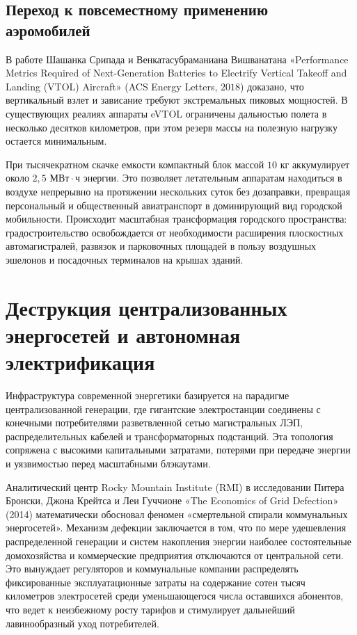 \documentclass[12pt,a4paper]{article}
\begin{document}
\subsection{Переход к повсеместному применению аэромобилей}

В работе Шашанка Срипада и Венкатасубраманиана Вишванатана 
«Performance Metrics Required of Next-Generation Batteries 
to Electrify Vertical Takeoff and Landing (VTOL) Aircraft» 
(ACS Energy Letters, $2018$) доказано, что вертикальный взлет и 
зависание требуют экстремальных пиковых мощностей. В существующих 
реалиях аппараты eVTOL ограничены дальностью полета в несколько 
десятков километров, при этом резерв массы на полезную нагрузку 
остается минимальным. 

При тысячекратном скачке емкости компактный 
блок массой $10\text{ кг}$ аккумулирует около 
$2{,}5\text{ МВт}\cdot\text{ч}$ энергии. Это позволяет летательным 
аппаратам находиться в воздухе непрерывно на протяжении нескольких 
суток без дозаправки, превращая персональный и общественный 
авиатранспорт в доминирующий вид городской мобильности. Происходит 
масштабная трансформация городского пространства: градостроительство 
освобождается от необходимости расширения плоскостных автомагистралей, 
развязок и парковочных площадей в пользу воздушных эшелонов и 
посадочных терминалов на крышах зданий.

\section{Деструкция централизованных энергосетей и автономная электрификация}

Инфраструктура современной энергетики базируется на парадигме 
централизованной генерации, где гигантские электростанции соединены с 
конечными потребителями разветвленной сетью магистральных ЛЭП, 
распределительных кабелей и трансформаторных подстанций. Эта топология 
сопряжена с высокими капитальными затратами, потерями при передаче 
энергии и уязвимостью перед масштабными блэкаутами.

Аналитический центр 
Rocky Mountain Institute (RMI) в исследовании Питера Бронски, Джона 
Крейтса и Леи Гуччионе «The Economics of Grid Defection» (2014) 
математически обосновал феномен «смертельной спирали коммунальных 
энергосетей». Механизм дефекции заключается в 
том, что по мере удешевления распределенной генерации и систем 
накопления энергии наиболее состоятельные домохозяйства и коммерческие 
предприятия отключаются от центральной сети. Это вынуждает регуляторов 
и коммунальные компании распределять фиксированные эксплуатационные 
затраты на содержание сотен тысяч километров электросетей среди 
уменьшающегося числа оставшихся абонентов, что ведет к неизбежному 
росту тарифов и стимулирует дальнейший лавинообразный уход 
потребителей.
\end{document}
